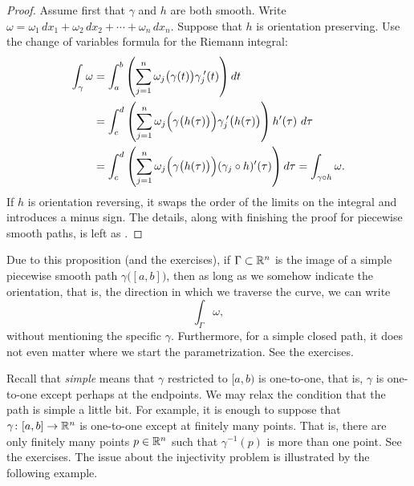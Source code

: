 \begin{proof}
Assume first that $\gamma$ and $h$ are both smooth.
Write $\omega = \omega_1 \, dx_1 + \omega_2 \, dx_2 + \cdots +
\omega_n \, dx_n$.
Suppose that $h$ is orientation preserving.  Use
the change of variables formula for the Riemann integral:
\begin{equation*}
\begin{split}
\int_{\gamma} \omega
& =
\int_a^b 
\left(
\sum_{j=1}^n
\omega_j\bigl(\gamma(t)\bigr) \gamma_j^{\:\prime}(t)
\right) dt
\\
& =
\int_c^d 
\left(
\sum_{j=1}^n
\omega_j\Bigl(\gamma\bigl(h(\tau)\bigr)\Bigr) \gamma_j^{\:\prime}\bigl(h(\tau)\bigr)
\right) h'(\tau) ~ d\tau
\\
& =
\int_c^d 
\left(
\sum_{j=1}^n
\omega_j\Bigl(\gamma\bigl(h(\tau)\bigr)\Bigr) (\gamma_j \circ h)'(\tau)
\right) d\tau
=
\int_{\gamma \circ h} \omega .
\end{split}
\end{equation*}
If $h$ is orientation reversing, it swaps the order of the limits on the
integral and introduces a minus sign.
The details, along with finishing the proof for piecewise smooth
paths, is left as .
\end{proof}

Due to this proposition (and the exercises), if $\Gamma
\subset {\mathbb{R}}^n$ is the image of a simple piecewise smooth path
$\gamma\bigl([a,b]\bigr)$, then as long as we somehow indicate the orientation, that
is, the direction in which we traverse the curve, we can write
\begin{equation*}
\int_{\Gamma} \omega ,
\end{equation*}
without mentioning the specific $\gamma$.
Furthermore, for a simple closed path, it does not even matter where we
start the parametrization.  See the exercises.

Recall that \emph{simple} means that $\gamma$ restricted to $[a,b)$ is
one-to-one, that is, $\gamma$ is one-to-one except perhaps at the endpoints.
We may relax the condition that the path is simple a little bit.
For example, it is enough to suppose that
$\gamma \colon [a,b] \to {\mathbb{R}}^n$ is one-to-one except at finitely many points.  That
is, there are only finitely many points $p \in {\mathbb{R}}^n$ such that
$\gamma^{-1}(p)$ is more than one point.  See the exercises.  The issue about the
injectivity
problem is illustrated by the following example.

